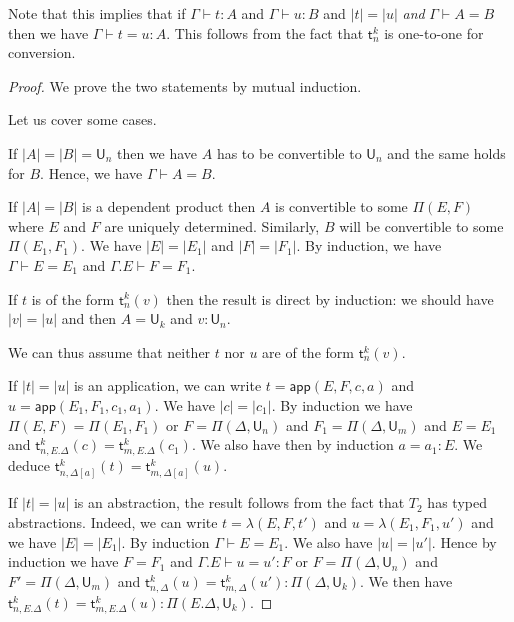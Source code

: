 \documentclass[11pt,a4paper]{article}
\theoremstyle{definition}
\def\UU{\mathsf{U}}
\newcommand{\APP}{\mathsf{app}}
\newcommand{\sT}{\mathsf{t}}
\begin{document}
Note that this implies that if
$\Gamma\vdash t:A$ and $\Gamma\vdash u:B$ and $|t| = |u|$ {\em and} $\Gamma\vdash A = B$ then
we have $\Gamma\vdash t = u : A$. This follows from the fact that $\sT^k_n$ is one-to-one for conversion.

\begin{proof}
  We prove the two statements by mutual induction.

  Let us cover some cases.

  If $|A| = |B| = \UU_n$ then we have $A$ has to be convertible to $\UU_n$ and the same holds for $B$.
  Hence, we have $\Gamma\vdash A = B$.

  If $|A| = |B|$ is a dependent product then $A$ is 
  convertible to some $\Pi(E,F)$ where $E$ and $F$ are uniquely determined. Similarly, 
  $B$ will be convertible to some $\Pi(E_1,F_1)$. We have $|E| = |E_1|$ and $|F| = |F_1|$. By induction, we have
  $\Gamma\vdash E = E_1$ and $\Gamma.E \vdash F = F_1$.

  If $t$ is of the form $\sT^k_n(v)$ then the result is direct by induction: we should have $|v| = |u|$
  and then $A = \UU_k$ and $v:\UU_n$.

  We can thus assume that neither $t$ nor $u$ are of the form $\sT^k_n(v)$.

  If $|t|=|u|$ is an application, we can write $t = \APP(E,F,c,a)$ and $u = \APP(E_1,F_1,c_1,a_1)$.
  We have $|c| = |c_1|$. By induction we have $\Pi(E,F) = \Pi(E_1,F_1)$ or
  $F = \Pi(\Delta,\UU_n)$ and $F_1 = \Pi(\Delta,\UU_m)$ and $E = E_1$ and
  $\sT^k_{n,E.\Delta}(c) = \sT^k_{m,E.\Delta}(c_1)$. We also have then by induction $a = a_1:E$.
  We deduce $\sT^k_{n,\Delta[a]}(t) = \sT^k_{m,\Delta[a]}(u)$.

  If $|t| = |u|$ is an abstraction, the result follows from the fact that $T_2$ has typed abstractions.
  Indeed, we can write $t = \lambda(E,F,t')$ and $u = \lambda(E_1,F_1,u')$ and we have
  $|E| = |E_1|$. By induction $\Gamma\vdash E = E_1$. We also have $|u| = |u'|$. Hence by induction
  we have $F = F_1$ and $\Gamma.E\vdash u = u':F$ or $F = \Pi(\Delta,\UU_n)$ and $F' = \Pi(\Delta,\UU_m)$
  and $\sT^k_{n,\Delta}(u) = \sT^k_{m,\Delta}(u'):\Pi(\Delta,\UU_k)$. We then have
  $\sT^k_{n,E.\Delta}(t) = \sT^k_{m,E.\Delta}(u):\Pi(E.\Delta,\UU_k)$.
\end{proof}





\end{document}
